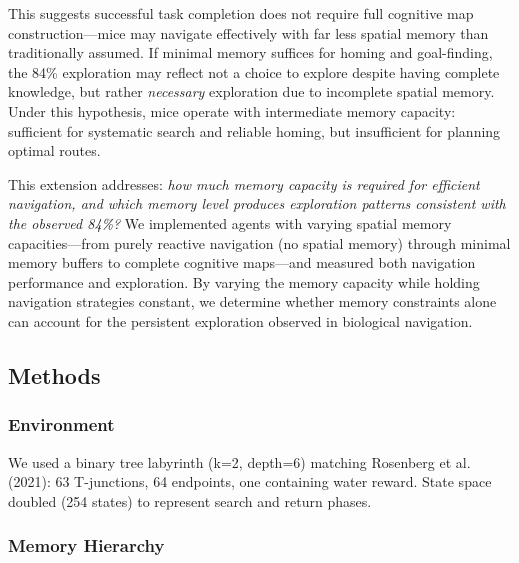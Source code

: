 This suggests successful task completion does not require full cognitive map construction—mice may navigate effectively with far less spatial memory than traditionally assumed. If minimal memory suffices for homing and goal-finding, the 84\% exploration may reflect not a choice to explore despite having complete knowledge, but rather \textit{necessary} exploration due to incomplete spatial memory. Under this hypothesis, mice operate with intermediate memory capacity: sufficient for systematic search and reliable homing, but insufficient for planning optimal routes.

This extension addresses: \textit{how much memory capacity is required for efficient navigation, and which memory level produces exploration patterns consistent with the observed 84\%?} We implemented agents with varying spatial memory capacities—from purely reactive navigation (no spatial memory) through minimal memory buffers to complete cognitive maps—and measured both navigation performance and exploration. By varying the memory capacity while holding navigation strategies constant, we determine whether memory constraints alone can account for the persistent exploration observed in biological navigation.

\subsection{Methods}

\subsubsection{Environment}
We used a binary tree labyrinth (k=2, depth=6) matching Rosenberg et al. (2021): 63 T-junctions, 64 endpoints, one containing water reward. State space doubled (254 states) to represent search and return phases.

\subsubsection{Memory Hierarchy}

